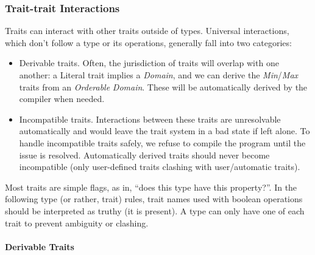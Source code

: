 \subsubsection{Trait-trait Interactions}
Traits can interact with other traits outside of types. Universal interactions, which don't follow a type or its operations, generally fall into two categories:
\begin{itemize}
    \item Derivable traits. Often, the jurisdiction of traits will overlap with one another: a Literal trait implies a \textit{Domain}, and we can derive the \textit{Min}/\textit{Max} traits from an \textit{Orderable} \textit{Domain}. These will be automatically derived by the compiler when needed.
    \item Incompatible traits. Interactions between these traits are unresolvable automatically and would leave the trait system in a bad state if left alone. To handle incompatible traits safely, we refuse to compile the program until the issue is resolved. Automatically derived traits should never become incompatible (only user-defined traits clashing with user/automatic traits).
\end{itemize}

Most traits are simple flags, as in, ``does this type have this property?''. In the following type (or rather, trait) rules, trait names used with boolean operations should be interpreted as truthy (it is present). A type can only have one of each trait to prevent ambiguity or clashing.


\paragraph{Derivable Traits}

